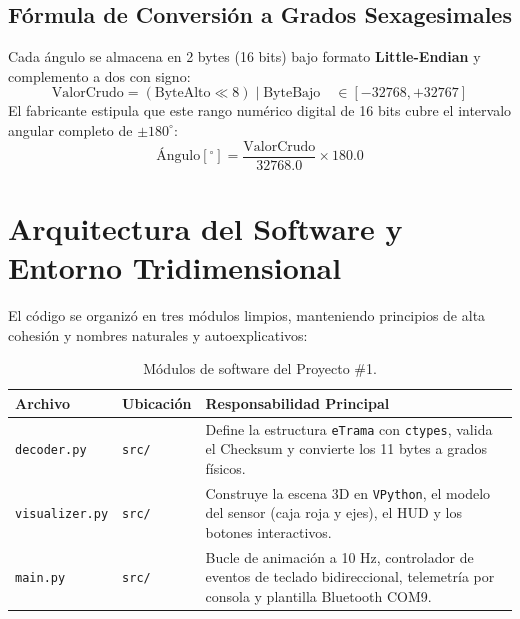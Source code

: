 \documentclass[12pt,letterpaper]{article}
\begin{document}
\subsection{Fórmula de Conversión a Grados Sexagesimales}
Cada ángulo se almacena en 2 bytes (16 bits) bajo formato \textbf{Little-Endian} y complemento a dos con signo:
\begin{equation}
\text{ValorCrudo} = (\text{ByteAlto} \ll 8) \mid \text{ByteBajo} \quad \in [-32768, +32767]
\end{equation}
El fabricante estipula que este rango numérico digital de 16 bits cubre el intervalo angular completo de $\pm 180^\circ$:
\begin{equation}
\text{Ángulo} [^\circ] = \frac{\text{ValorCrudo}}{32768.0} \times 180.0
\end{equation}

\section{Arquitectura del Software y Entorno Tridimensional}

El código se organizó en tres módulos limpios, manteniendo principios de alta cohesión y nombres naturales y autoexplicativos:

\begin{table}[H]
\centering
\caption{Módulos de software del Proyecto \#1.}
\label{tab:archivos_p1}
\begin{tabular}{llp{7.5cm}}
\toprule
\textbf{Archivo} & \textbf{Ubicación} & \textbf{Responsabilidad Principal} \\
\midrule
\texttt{decoder.py} & \texttt{src/} & Define la estructura \texttt{eTrama} con \texttt{ctypes}, valida el Checksum y convierte los 11 bytes a grados físicos. \\
\texttt{visualizer.py} & \texttt{src/} & Construye la escena 3D en \texttt{VPython}, el modelo del sensor (caja roja y ejes), el HUD y los botones interactivos. \\
\texttt{main.py} & \texttt{src/} & Bucle de animación a 10 Hz, controlador de eventos de teclado bidireccional, telemetría por consola y plantilla Bluetooth COM9. \\
\bottomrule
\end{tabular}
\end{table}
\end{document}
